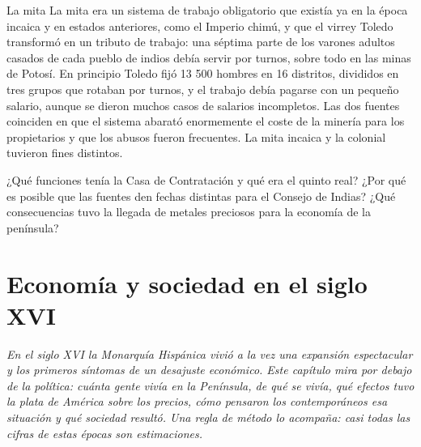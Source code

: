 \documentclass{book}
\begin{document}
\begin{tcolorbox}[title={Autoficha}, studiumcheck, breakable]

La mita
La mita era un sistema de trabajo obligatorio que existía ya en la época incaica y en estados anteriores, como el Imperio chimú, y que el virrey Toledo transformó en un tributo de trabajo: una séptima parte de los varones adultos casados de cada pueblo de indios debía servir por turnos, sobre todo en las minas de Potosí. En principio Toledo fijó 13 500 hombres en 16 distritos, divididos en tres grupos que rotaban por turnos, y el trabajo debía pagarse con un pequeño salario, aunque se dieron muchos casos de salarios incompletos. Las dos fuentes coinciden en que el sistema abarató enormemente el coste de la minería para los propietarios y que los abusos fueron frecuentes. La mita incaica y la colonial tuvieron fines distintos.


¿Qué funciones tenía la Casa de Contratación y qué era el quinto real? ¿Por qué es posible que las fuentes den fechas distintas para el Consejo de Indias? ¿Qué consecuencias tuvo la llegada de metales preciosos para la economía de la península?

\end{tcolorbox}

\chapter{Economía y sociedad en el siglo XVI}
\label{chap:hist-08}

\noindent\textit{En el siglo XVI la Monarquía Hispánica vivió a la vez una expansión espectacular y los primeros síntomas de un desajuste económico. Este capítulo mira por debajo de la política: cuánta gente vivía en la Península, de qué se vivía, qué efectos tuvo la plata de América sobre los precios, cómo pensaron los contemporáneos esa situación y qué sociedad resultó. Una regla de método lo acompaña: casi todas las cifras de estas épocas son estimaciones.}

\end{document}
